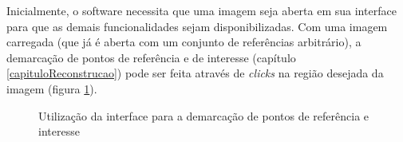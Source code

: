 		Inicialmente, o software necessita que uma imagem seja aberta em sua interface para que as demais funcionalidades sejam disponibilizadas. Com uma imagem carregada (que já é aberta com um conjunto de referências arbitrário), a demarcação de pontos de referência e de interesse (capítulo \ref{capituloReconstrucao}) pode ser feita através de \textit{clicks} na região desejada da imagem (figura \ref{printAppReconstrucaoDemarcacao}).
		
		\begin{figure}[!htb]
			\centering
			\enskip
			\enskip
			\enskip
			\caption{Utilização da interface para a demarcação de pontos de referência e interesse}
			\label{printAppReconstrucaoDemarcacao}
		\end{figure}
		
